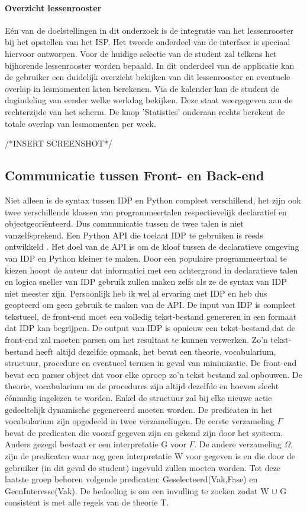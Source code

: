 \paragraph{Overzicht lessenrooster} 
E\'{e}n van de doelstellingen in dit onderzoek is de integratie van het lessenrooster bij het opstellen van het ISP. Het tweede onderdeel van de interface is speciaal hiervoor ontworpen. Voor de huidige selectie van de student zal telkens het bijhorende lessenrooster worden bepaald. In dit onderdeel van de applicatie kan de gebruiker een duidelijk overzicht bekijken van dit lessenrooster en eventuele overlap in lesmomenten laten berekenen. Via de kalender kan de student de dagindeling van eender welke werkdag bekijken. Deze staat weergegeven aan de rechterzijde van het scherm. De knop 'Statistics' onderaan rechts berekent de totale overlap van lesmomenten per week.

/*INSERT SCREENSHOT*/


\subsection{Communicatie tussen Front- en Back-end}
Niet alleen is de syntax tussen IDP en Python compleet verschillend, het zijn ook twee verschillende klassen van programmeertalen respectievelijk declaratief en objectgeori\"{e}nteerd. Dus communicatie tussen de twee talen is niet vanzelfsprekend. Een Python API die toelaat IDP te gebruiken is reeds ontwikkeld \citep{vennekens2015lowering}. Het doel van de API is om de kloof tussen de declaratieve omgeving van IDP en Python kleiner te maken. Door een populaire programmeertaal te kiezen hoopt de auteur dat informatici met een achtergrond in declaratieve talen en logica sneller van IDP gebruik zullen maken zelfs als ze de syntax van IDP niet meester zijn. Persoonlijk heb ik wel al ervaring met IDP en heb dus geopteerd om geen gebruik te maken van de API. De input van IDP is compleet tekstueel, de front-end moet een volledig tekst-bestand genereren in een formaat dat IDP kan begrijpen. De output van IDP is opnieuw een tekst-bestand dat de front-end zal moeten parsen om het resultaat te kunnen verwerken. Zo'n tekst-bestand heeft altijd dezelfde opmaak, het bevat een theorie, vocabularium, structuur, procedure en eventueel termen in geval van minimizatie. De front-end bevat een parser object dat voor elke oproep zo'n tekst bestand zal opbouwen. De theorie, vocabularium en de procedures zijn altijd dezelfde en hoeven slecht \'{e}\'{e}nmalig ingelezen te worden. Enkel de structuur zal bij elke nieuwe actie gedeeltelijk dynamische gegenereerd moeten worden. De predicaten in het vocabularium zijn opgedeeld in twee verzamelingen. De eerste verzameling $\Gamma$ bevat de predicaten die vooraf gegeven zijn en gekend zijn door het systeem. Anders gezegd bestaat er een interpretatie G voor $\Gamma$. De andere verzameling $\Omega$, zijn de predicaten waar nog geen interpretatie W voor gegeven is en die door de gebruiker (in dit geval de student) ingevuld zullen moeten worden. Tot deze laatste groep behoren volgende predicaten: Geselecteerd(Vak,Fase) en GeenInteresse(Vak). De bedoeling is om een invulling te zoeken zodat W $\cup$ G consistent is met alle regels van de theorie T.